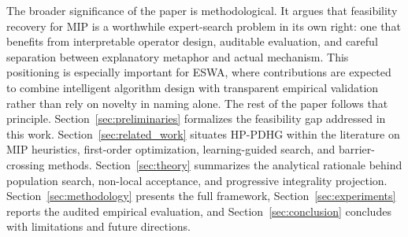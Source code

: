 The broader significance of the paper is methodological. It argues that feasibility recovery for MIP is a worthwhile expert-search problem in its own right: one that benefits from interpretable operator design, auditable evaluation, and careful separation between explanatory metaphor and actual mechanism. This positioning is especially important for ESWA, where contributions are expected to combine intelligent algorithm design with transparent empirical validation rather than rely on novelty in naming alone. The rest of the paper follows that principle. Section~\ref{sec:preliminaries} formalizes the feasibility gap addressed in this work. Section~\ref{sec:related_work} situates HP-PDHG within the literature on MIP heuristics, first-order optimization, learning-guided search, and barrier-crossing methods. Section~\ref{sec:theory} summarizes the analytical rationale behind population search, non-local acceptance, and progressive integrality projection. Section~\ref{sec:methodology} presents the full framework, Section~\ref{sec:experiments} reports the audited empirical evaluation, and Section~\ref{sec:conclusion} concludes with limitations and future directions.
